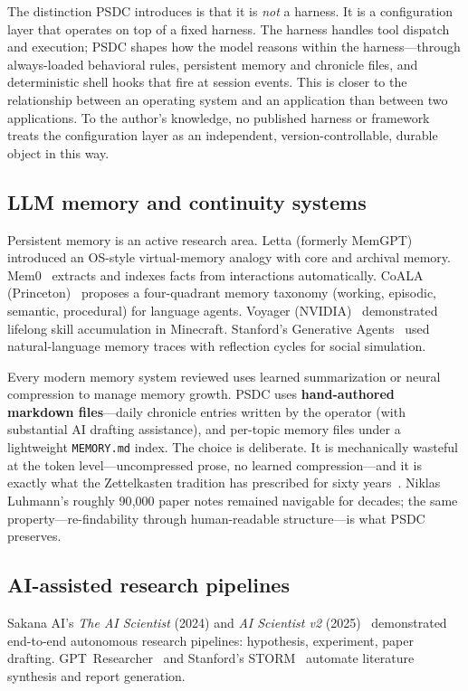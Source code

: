 \documentclass[12pt]{article}
\begin{document}
The distinction PSDC introduces is that it is \emph{not} a harness. It is a configuration layer that operates on top of a fixed harness. The harness handles tool dispatch and execution; PSDC shapes how the model reasons within the harness---through always-loaded behavioral rules, persistent memory and chronicle files, and deterministic shell hooks that fire at session events. This is closer to the relationship between an operating system and an application than between two applications. To the author's knowledge, no published harness or framework treats the configuration layer as an independent, version-controllable, durable object in this way.

\subsection{LLM memory and continuity systems}

Persistent memory is an active research area. Letta (formerly MemGPT)~\cite{memgpt} introduced an OS-style virtual-memory analogy with core and archival memory. Mem0~\cite{mem0} extracts and indexes facts from interactions automatically. CoALA (Princeton)~\cite{coala} proposes a four-quadrant memory taxonomy (working, episodic, semantic, procedural) for language agents. Voyager (NVIDIA)~\cite{voyager} demonstrated lifelong skill accumulation in Minecraft. Stanford's Generative Agents~\cite{genagents} used natural-language memory traces with reflection cycles for social simulation.

Every modern memory system reviewed uses learned summarization or neural compression to manage memory growth. PSDC uses \textbf{hand-authored markdown files}---daily chronicle entries written by the operator (with substantial AI drafting assistance), and per-topic memory files under a lightweight \texttt{MEMORY.md} index. The choice is deliberate. It is mechanically wasteful at the token level---uncompressed prose, no learned compression---and it is exactly what the Zettelkasten tradition has prescribed for sixty years~\cite{luhmann,ahrens}. Niklas Luhmann's roughly 90{,}000 paper notes remained navigable for decades; the same property---re-findability through human-readable structure---is what PSDC preserves.

\subsection{AI-assisted research pipelines}

Sakana AI's \emph{The AI Scientist} (2024) and \emph{AI Scientist v2} (2025)~\cite{aiscientist} demonstrated end-to-end autonomous research pipelines: hypothesis, experiment, paper drafting. GPT~Researcher~\cite{gptresearcher} and Stanford's STORM~\cite{storm} automate literature synthesis and report generation.
\end{document}
